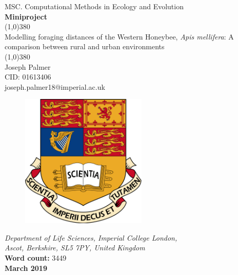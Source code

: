 \documentclass[11pt]{article}
\begin{document}
\begin{titlepage}
\begin{center}
	\large{MSC. Computational Methods in Ecology and Evolution }\\
	\textbf{ Miniproject }\\[0cm]
	\huge{\line(1,0){380}\\
		Modelling foraging distances of the Western Honeybee, \textit{Apis mellifera}: A comparison between rural and urban environments\\
	\line(1,0){380}}\\[1cm]
	\large{ Joseph Palmer\\ CID: 01613406}\\[0cm]
	{joseph.palmer18@imperial.ac.uk }\\[1.2cm]
	\begin{figure}[h]
	\includegraphics[width=6cm]{../Writeup/WriteupImages/ImperialCrest.png}
	\centering
	\end{figure}
	\normalsize{\textit{Department of Life Sciences, Imperial College London,}\\
		\textit{Ascot, Berkshire, SL5 7PY, United Kingdom}}\\[0.5cm]
	\small{\textbf{Word count:} 3449}\\
	\small{\textbf{March 2019}}
\end{center}
\end{titlepage}
\newpage
\tableofcontents
\newpage
\end{document}
